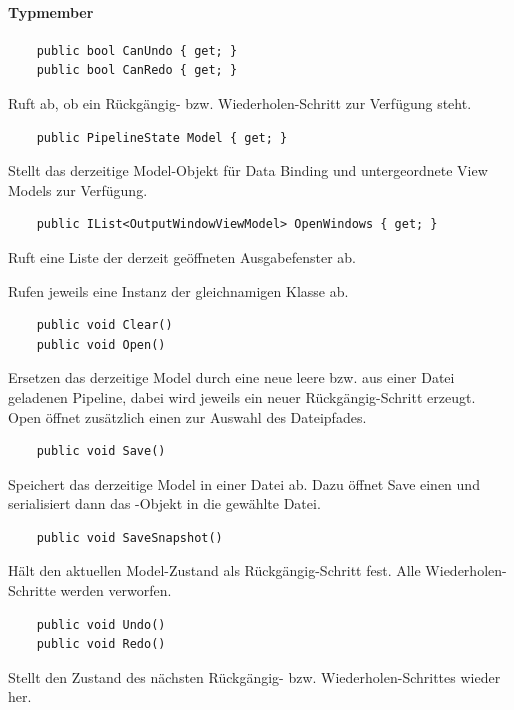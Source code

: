 \paragraph{Typmember}
\begin{itemize}

	\begin{verbatim}
	public bool CanUndo { get; }
	public bool CanRedo { get; }
	\end{verbatim}
	Ruft ab, ob ein Rückgängig- bzw. Wiederholen-Schritt zur Verfügung steht.

	\begin{verbatim}
	public PipelineState Model { get; }
	\end{verbatim}
	Stellt das derzeitige Model-Objekt für Data Binding und untergeordnete View Models zur Verfügung.

	\begin{verbatim}
	public IList<OutputWindowViewModel> OpenWindows { get; }
	\end{verbatim}
	Ruft eine Liste der derzeit geöffneten Ausgabefenster ab.


	Rufen jeweils eine Instanz der gleichnamigen Klasse ab.

	\begin{verbatim}
	public void Clear()
	public void Open()
	\end{verbatim}
	Ersetzen das derzeitige Model durch eine neue leere bzw. aus einer Datei geladenen Pipeline, dabei wird jeweils ein neuer Rückgängig-Schritt erzeugt. Open öffnet zusätzlich einen  zur Auswahl des Dateipfades.

	\begin{verbatim}
	public void Save()
	\end{verbatim}
	Speichert das derzeitige Model in einer Datei ab. Dazu öffnet Save einen  und serialisiert dann das -Objekt in die gewählte Datei.

	\begin{verbatim}
	public void SaveSnapshot()
	\end{verbatim}
	Hält den aktuellen Model-Zustand als Rückgängig-Schritt fest. Alle Wiederholen-Schritte werden verworfen.

	\begin{verbatim}
	public void Undo()
	public void Redo()
	\end{verbatim}
	Stellt den Zustand des nächsten Rückgängig- bzw. Wiederholen-Schrittes wieder her.

\end{itemize}

